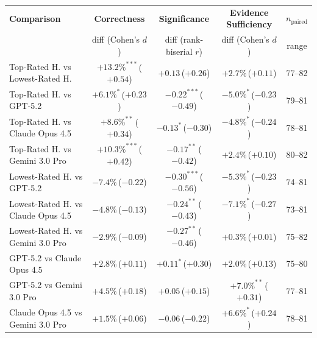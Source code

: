 \begin{table}[t]
\centering
\fontsize{7.5}{9.5}\selectfont
\setlength{\tabcolsep}{4pt}
\begin{tabular}{l ccc c}
\toprule
\textbf{Comparison} & \textbf{Correctness} & \textbf{Significance} & \textbf{Evidence Sufficiency} & \textbf{$n_{\text{paired}}$} \\
                    & {\scriptsize diff (Cohen's $d$)} & {\scriptsize diff (rank-biserial $r$)} & {\scriptsize diff (Cohen's $d$)} & {\scriptsize range} \\
\midrule
Top-Rated H. vs Lowest-Rated H. & $+13.2\%^{***}$\,({\scriptsize $+0.54$}) & $+0.13$\,({\scriptsize $+0.26$})       & $+2.7\%$\,({\scriptsize $+0.11$})       & 77--82 \\
Top-Rated H. vs GPT-5.2         & $+6.1\%^{*}$\,({\scriptsize $+0.23$})   & $-0.22^{***}$\,({\scriptsize $-0.49$}) & $-5.0\%^{*}$\,({\scriptsize $-0.23$})   & 79--81 \\
Top-Rated H. vs Claude Opus 4.5 & $+8.6\%^{**}$\,({\scriptsize $+0.34$})  & $-0.13^{*}$\,({\scriptsize $-0.30$})   & $-4.8\%^{*}$\,({\scriptsize $-0.24$})   & 78--81 \\
Top-Rated H. vs Gemini 3.0 Pro  & $+10.3\%^{***}$\,({\scriptsize $+0.42$}) & $-0.17^{**}$\,({\scriptsize $-0.42$})  & $+2.4\%$\,({\scriptsize $+0.10$})       & 80--82 \\
\midrule
Lowest-Rated H. vs GPT-5.2      & $-7.4\%$\,({\scriptsize $-0.22$})       & $-0.30^{***}$\,({\scriptsize $-0.56$}) & $-5.3\%^{*}$\,({\scriptsize $-0.23$})   & 74--81 \\
Lowest-Rated H. vs Claude Opus 4.5 & $-4.8\%$\,({\scriptsize $-0.13$})    & $-0.24^{**}$\,({\scriptsize $-0.43$})  & $-7.1\%^{*}$\,({\scriptsize $-0.27$})   & 73--81 \\
Lowest-Rated H. vs Gemini 3.0 Pro  & $-2.9\%$\,({\scriptsize $-0.09$})    & $-0.27^{**}$\,({\scriptsize $-0.46$})  & $+0.3\%$\,({\scriptsize $+0.01$})       & 75--82 \\
\midrule
GPT-5.2 vs Claude Opus 4.5      & $+2.8\%$\,({\scriptsize $+0.11$})      & $+0.11^{*}$\,({\scriptsize $+0.30$})   & $+2.0\%$\,({\scriptsize $+0.13$})       & 75--80 \\
GPT-5.2 vs Gemini 3.0 Pro       & $+4.5\%$\,({\scriptsize $+0.18$})      & $+0.05$\,({\scriptsize $+0.15$})       & $+7.0\%^{**}$\,({\scriptsize $+0.31$})  & 77--81 \\
Claude Opus 4.5 vs Gemini 3.0 Pro & $+1.5\%$\,({\scriptsize $+0.06$})    & $-0.06$\,({\scriptsize $-0.22$})       & $+6.6\%^{*}$\,({\scriptsize $+0.24$})   & 78--81 \\

\end{tabular}
\end{table}
